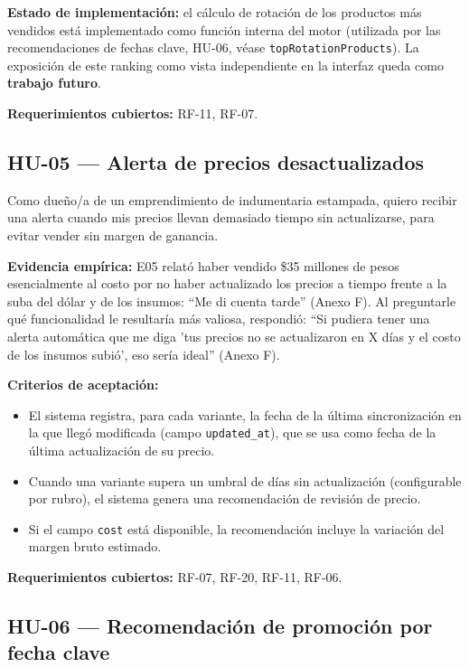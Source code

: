 \noindent\textbf{Estado de implementación:} el cálculo de rotación de los productos más vendidos está implementado como función interna del motor (utilizada por las recomendaciones de fechas clave, HU-06, véase \texttt{topRotationProducts}). La exposición de este ranking como vista independiente en la interfaz queda como \textbf{trabajo futuro}.

\noindent\textbf{Requerimientos cubiertos:} RF-11, RF-07.

\subsection{HU-05 --- Alerta de precios desactualizados}
\label{sec:hu-05}

Como dueño/a de un emprendimiento de indumentaria estampada, quiero recibir una alerta cuando mis precios llevan demasiado tiempo sin actualizarse, para evitar vender sin margen de ganancia.

\noindent\textbf{Evidencia empírica:} E05 relató haber vendido \$35 millones de pesos esencialmente al costo por no haber actualizado los precios a tiempo frente a la suba del dólar y de los insumos: \enquote{Me di cuenta tarde} (Anexo F). Al preguntarle qué funcionalidad le resultaría más valiosa, respondió: \enquote{Si pudiera tener una alerta automática que me diga 'tus precios no se actualizaron en X días y el costo de los insumos subió', eso sería ideal} (Anexo F).

\noindent\textbf{Criterios de aceptación:}
\begin{itemize}
    \item El sistema registra, para cada variante, la fecha de la última sincronización en la que llegó modificada (campo \texttt{updated\_at}), que se usa como fecha de la última actualización de su precio.
    \item Cuando una variante supera un umbral de días sin actualización (configurable por rubro), el sistema genera una recomendación de revisión de precio.
    \item Si el campo \texttt{cost} está disponible, la recomendación incluye la variación del margen bruto estimado.
\end{itemize}

\noindent\textbf{Requerimientos cubiertos:} RF-07, RF-20, RF-11, RF-06.

\subsection{HU-06 --- Recomendación de promoción por fecha clave}
\label{sec:hu-06}


